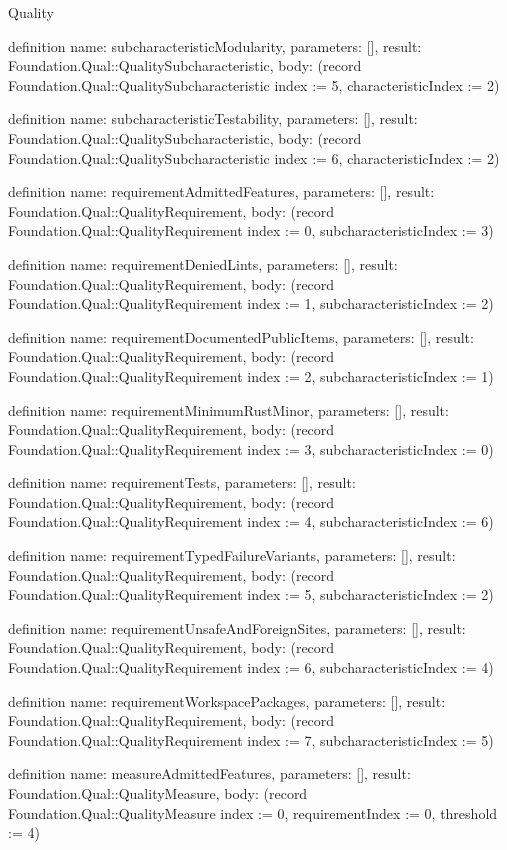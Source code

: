 \begin{lexlean}{Quality}
\begin{semanticmodule}
definition{
  name: subcharacteristicModularity,
  parameters: [],
  result: Foundation.Qual::QualitySubcharacteristic,
  body: (record Foundation.Qual::QualitySubcharacteristic {index := 5, characteristicIndex := 2})
}

definition{
  name: subcharacteristicTestability,
  parameters: [],
  result: Foundation.Qual::QualitySubcharacteristic,
  body: (record Foundation.Qual::QualitySubcharacteristic {index := 6, characteristicIndex := 2})
}

definition{
  name: requirementAdmittedFeatures,
  parameters: [],
  result: Foundation.Qual::QualityRequirement,
  body: (record Foundation.Qual::QualityRequirement {index := 0, subcharacteristicIndex := 3})
}

definition{
  name: requirementDeniedLints,
  parameters: [],
  result: Foundation.Qual::QualityRequirement,
  body: (record Foundation.Qual::QualityRequirement {index := 1, subcharacteristicIndex := 2})
}

definition{
  name: requirementDocumentedPublicItems,
  parameters: [],
  result: Foundation.Qual::QualityRequirement,
  body: (record Foundation.Qual::QualityRequirement {index := 2, subcharacteristicIndex := 1})
}

definition{
  name: requirementMinimumRustMinor,
  parameters: [],
  result: Foundation.Qual::QualityRequirement,
  body: (record Foundation.Qual::QualityRequirement {index := 3, subcharacteristicIndex := 0})
}

definition{
  name: requirementTests,
  parameters: [],
  result: Foundation.Qual::QualityRequirement,
  body: (record Foundation.Qual::QualityRequirement {index := 4, subcharacteristicIndex := 6})
}

definition{
  name: requirementTypedFailureVariants,
  parameters: [],
  result: Foundation.Qual::QualityRequirement,
  body: (record Foundation.Qual::QualityRequirement {index := 5, subcharacteristicIndex := 2})
}

definition{
  name: requirementUnsafeAndForeignSites,
  parameters: [],
  result: Foundation.Qual::QualityRequirement,
  body: (record Foundation.Qual::QualityRequirement {index := 6, subcharacteristicIndex := 4})
}

definition{
  name: requirementWorkspacePackages,
  parameters: [],
  result: Foundation.Qual::QualityRequirement,
  body: (record Foundation.Qual::QualityRequirement {index := 7, subcharacteristicIndex := 5})
}

definition{
  name: measureAdmittedFeatures,
  parameters: [],
  result: Foundation.Qual::QualityMeasure,
  body: (record Foundation.Qual::QualityMeasure {index := 0, requirementIndex := 0, threshold := 4})
}


\end{semanticmodule}
\end{lexlean}
